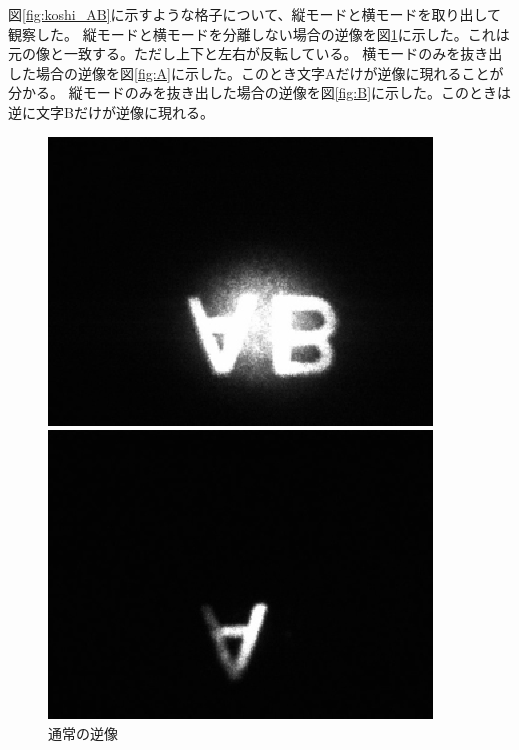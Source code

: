 \documentclass[11pt,a4]{jarticle}
\begin{document}
図\ref{fig:koshi_AB}に示すような格子について、縦モードと横モードを取り出して観察した。
縦モードと横モードを分離しない場合の逆像を図\ref{fig:AB}に示した。これは元の像と一致する。ただし上下と左右が反転している。
横モードのみを抜き出した場合の逆像を図\ref{fig:A}に示した。このとき文字Aだけが逆像に現れることが分かる。
縦モードのみを抜き出した場合の逆像を図\ref{fig:B}に示した。このときは逆に文字Bだけが逆像に現れる。
\begin{figure}[htbp]
 \begin{minipage}{0.33\hsize}
   \begin{center}
    \includegraphics[width=0.9\hsize]{./AB.eps}
    \caption{通常の逆像}
     \label{fig:AB}
   \end{center}
 \end{minipage}
 \begin{minipage}{0.33\hsize}
   \begin{center}
    \includegraphics[width=0.9\hsize]{./A.eps}

\end{center}
\end{minipage}
\end{figure}
\end{document}
